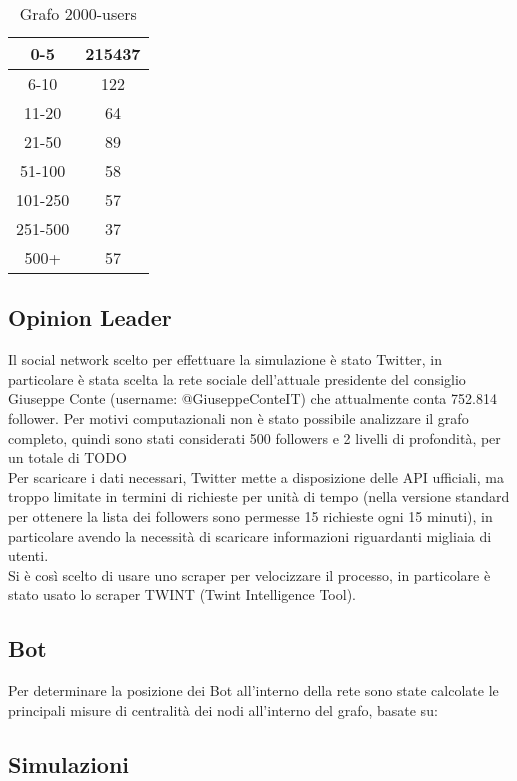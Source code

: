     \begin{table}[h!]
    \begin{tabular}{ |c|c| }
     \hline
     0-5 & 215437 \\
     \hline
     6-10 & 122 \\
     \hline
     11-20 & 64 \\
     \hline
     21-50 & 89 \\
     \hline
     51-100 & 58 \\
     \hline
     101-250 & 57 \\
     \hline
     251-500 & 37 \\
     \hline
     500+ & 57 \\
     \hline
    \end{tabular}
    \caption{Grafo 2000-users}
    \end{table}
    \subsection{Opinion Leader}
    Il social network scelto per effettuare la simulazione è stato Twitter, in particolare è stata scelta la rete sociale dell’attuale presidente del consiglio Giuseppe Conte (username: @GiuseppeConteIT\cite{twitterGiuseppeConte}) che attualmente conta 752.814 follower. Per motivi computazionali non è stato possibile analizzare il grafo completo, quindi sono stati considerati 500 followers e 2 livelli di profondità, per un totale di TODO \\
    Per scaricare i dati necessari, Twitter mette a disposizione delle API ufficiali, ma troppo limitate in termini di richieste per unità di tempo (nella versione standard per ottenere la lista dei followers sono permesse 15 richieste ogni 15 minuti), in particolare avendo la necessità di scaricare informazioni riguardanti migliaia di utenti.\\
    Si è così scelto di usare uno scraper per velocizzare il processo, in particolare è stato usato lo scraper TWINT\cite{Twint} (Twint Intelligence Tool).
    \subsection{Bot}
    Per determinare la posizione dei Bot all'interno della rete sono state calcolate le principali misure di centralità dei nodi all'interno del grafo, basate su:
    
    \subsection{Simulazioni}

